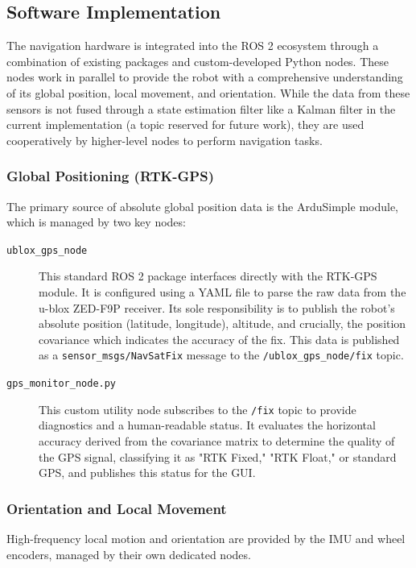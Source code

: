 \subsection{Software Implementation}
\label{ssec:nav_software}
The navigation hardware is integrated into the ROS 2 ecosystem through a combination of existing packages and custom-developed Python nodes. These nodes work in parallel to provide the robot with a comprehensive understanding of its global position, local movement, and orientation. While the data from these sensors is not fused through a state estimation filter like a Kalman filter in the current implementation (a topic reserved for future work), they are used cooperatively by higher-level nodes to perform navigation tasks.

\subsubsection{Global Positioning (RTK-GPS)}
The primary source of absolute global position data is the ArduSimple module, which is managed by two key nodes:

\begin{description}
    \item[\texttt{ublox\_gps\_node}] This standard ROS 2 package interfaces directly with the RTK-GPS module. It is configured using a YAML file to parse the raw data from the u-blox ZED-F9P receiver. Its sole responsibility is to publish the robot's absolute position (latitude, longitude), altitude, and crucially, the position covariance which indicates the accuracy of the fix. This data is published as a \texttt{sensor\_msgs/NavSatFix} message to the \texttt{/ublox\_gps\_node/fix} topic.

    \item[\texttt{gps\_monitor\_node.py}] This custom utility node subscribes to the \texttt{/fix} topic to provide diagnostics and a human-readable status. It evaluates the horizontal accuracy derived from the covariance matrix to determine the quality of the GPS signal, classifying it as "RTK Fixed," "RTK Float," or standard GPS, and publishes this status for the GUI.
\end{description}

\subsubsection{Orientation and Local Movement}
High-frequency local motion and orientation are provided by the IMU and wheel encoders, managed by their own dedicated nodes.

